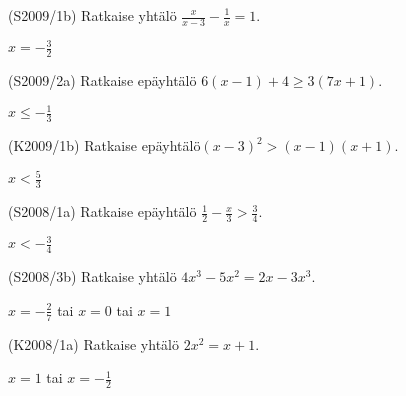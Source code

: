 \begin{tehtava}
(S2009/1b) Ratkaise yhtälö $\frac{x}{x-3}-\frac{1}{x}=1$.
\begin{vastaus}
$x=-\frac{3}{2}$
\end{vastaus}
\end{tehtava}

\begin{tehtava}
(S2009/2a) Ratkaise epäyhtälö $6(x-1)+4 \geq 3(7x+1)$. 
\begin{vastaus}
$x \leq -\frac{1}{3}$
\end{vastaus}
\end{tehtava}


\begin{tehtava}
(K2009/1b) Ratkaise epäyhtälö$(x-3)^2>(x-1)(x+1)$.
\begin{vastaus}
$x<\frac{5}{3}$
\end{vastaus}
\end{tehtava}

\begin{tehtava}
(S2008/1a) Ratkaise epäyhtälö $\frac{1}{2} - \frac{x}{3} > \frac{3}{4}$.
\begin{vastaus}
$x<-\frac{3}{4}$
\end{vastaus}
\end{tehtava}


\begin{tehtava}
(S2008/3b) Ratkaise yhtälö $4x^3-5x^2=2x-3x^3$.
\begin{vastaus}
$x=-\frac{2}{7}$ tai $x=0$ tai $x=1$
\end{vastaus}
\end{tehtava}


\begin{tehtava}
(K2008/1a) Ratkaise yhtälö $2x^2=x+1$.
\begin{vastaus}
$x=1$ tai $x=-\frac{1}{2}$
\end{vastaus}
\end{tehtava}

